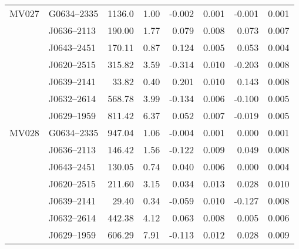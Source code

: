 \begin{table}[h]
\begin{tabular}{llrrrrrr}
			MV027 &G0634--2335 & 1136.0 & 1.00   &   -0.002  & 0.001   &   -0.001 &  0.001  \\ 
			&J0636--2113 & 190.00 & 1.77   &    0.079  & 0.008   &    0.073 &  0.007  \\ 
			&J0643--2451 & 170.11 & 0.87   &    0.124  & 0.005   &    0.053 &  0.004  \\ 
			&J0620--2515 & 315.82 & 3.59   &   -0.314  & 0.010   &   -0.203 &  0.008  \\ 
			&J0639--2141 &  33.82 & 0.40   &    0.201  & 0.010   &    0.143 &  0.008  \\ 
			&J0632--2614 & 568.78 & 3.99   &   -0.134  & 0.006   &   -0.100 &  0.005  \\ 
			&J0629--1959 & 811.42 & 6.37   &    0.052  & 0.007   &   -0.019 &  0.005  \\ \hline
			MV028 &G0634--2335 & 947.04 & 1.06   &   -0.004  & 0.001   &    0.000 &  0.001  \\ 
			&J0636--2113 & 146.42 & 1.56   &   -0.122  & 0.009   &    0.049 &  0.008  \\ 
			&J0643--2451 & 130.05 & 0.74   &    0.040  & 0.006   &    0.000 &  0.004  \\ 
			&J0620--2515 & 211.60 & 3.15   &    0.034  & 0.013   &    0.028 &  0.010  \\ 
			&J0639--2141 &  29.40 & 0.34   &   -0.059  & 0.010   &   -0.127 &  0.008  \\ 
			&J0632--2614 & 442.38 & 4.12   &    0.063  & 0.008   &    0.005 &  0.006  \\ 
			&J0629--1959 & 606.29 & 7.91   &   -0.113  & 0.012   &    0.028 &  0.009  \\ \bottomrule
		\end{tabular}
\end{table}

